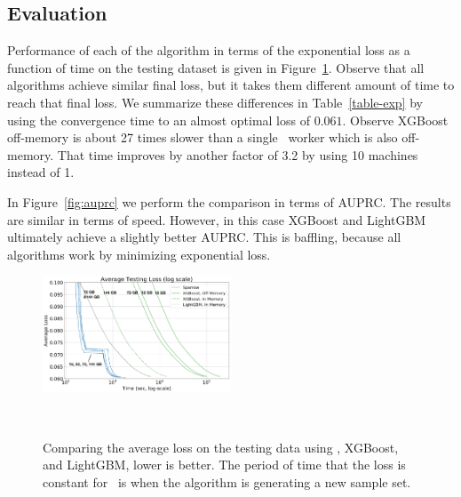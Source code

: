 \subsection{Evaluation}

Performance of each of the algorithm in terms of
the exponential loss as a function of time on the testing dataset is given in
Figure~\ref{fig:loss}. Observe that all algorithms achieve similar
final loss, but it takes them different amount of time to reach that
final loss. We summarize these differences in Table~\ref{table-exp} by
using the convergence time to an almost optimal loss of
$0.061$. Observe  XGBoost off-memory is about 27
times slower than a single \Sparrow\ worker which is also off-memory. That
time improves by another factor of 3.2 by using 10 machines instead of 1.

In Figure~\ref{fig:auprc} we perform the comparison in terms of
AUPRC. The results are similar in terms of speed. However, in this
case XGBoost and LightGBM ultimately achieve a slightly better
AUPRC. This is baffling, because all algorithms work by minimizing
exponential loss.

\begin{figure}[t]
    \centering
    \includegraphics[width=0.5\textwidth]{figs/splice-loss2m.png}
    \caption{Comparing the average loss on the testing data using \Sparrow, XGBoost, and LightGBM, lower is better.
        The period of time that the loss is constant for \Sparrow\ is when the algorithm is generating a new sample set.}~\label{fig:loss}
\end{figure}



